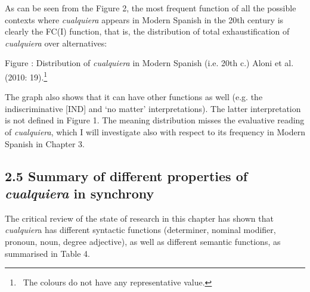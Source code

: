 \begin{styleStandard}
As can be seen from the Figure 2, the most frequent function of all the possible contexts where \textit{cualquiera} appears in Modern Spanish in the 20th century is clearly the FC(I) function, that is, the distribution of total exhaustification of \textit{cualquiera} over alternatives:
\end{styleStandard}

\begin{styleStandard}
  [Warning: Image ignored] %
 
\end{styleStandard}

\begin{styletablecaption}
Figure : Distribution of \textit{cualquiera} in Modern Spanish (i.e. 20th c.) Aloni et al. (2010: 19).\footnote{\textrm{\ The colours do not have any representative value.}}
\end{styletablecaption}

\begin{styleStandard}
The graph also shows that it can have other functions as well (e.g. the indiscriminative [IND] and ‘no matter’ interpretations). The latter interpretation is not defined in Figure 1. The meaning distribution misses the evaluative reading of \textit{cualquiera}, which I will investigate also with respect to its frequency in Modern Spanish in Chapter 3.
\end{styleStandard}

\subsection[2.5 Summary of different properties of cualquiera in synchrony]{\textbf{2.5 Summary of different properties of }\textbf{\textit{cualquiera}}\textbf{ in synchrony}}
\begin{styleStandard}
The critical review of the state of research in this chapter has shown that \textit{cualquier}a has different syntactic functions (determiner, nominal modifier, pronoun, noun, degree adjective), as well as different semantic functions, as summarised in Table 4.
\end{styleStandard}

